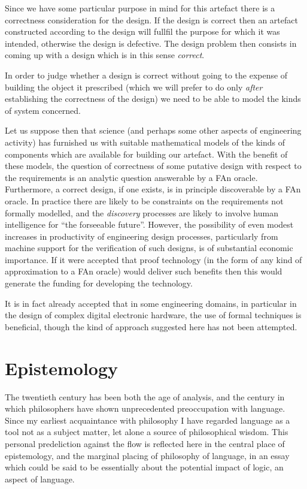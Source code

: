 Since we have some particular purpose in mind for this artefact there is a correctness consideration for the design.
If the design is correct then an artefact constructed according to the design will fullfil the purpose for which it was intended, otherwise the design is defective.
The design problem then consists in coming up with a design which is in this sense {\it correct}.

In order to judge whether a design is correct without going to the expense of building the object it prescribed (which we will prefer to do only {\it after} establishing the correctness of the design) we need to be able to model the kinds of system concerned.

Let us suppose then that science (and perhaps some other aspects of engineering activity) has furnished us with suitable mathematical models of the kinds of components which are available for building our artefact.
With the benefit of these models, the question of correctness of some putative design with respect to the requirements is an analytic question answerable by a FAn oracle.
Furthermore, a correct design, if one exists, is in principle discoverable by a FAn oracle.
In practice there are likely to be constraints on the requirements not formally modelled, and the {\it discovery} processes are likely to involve human intelligence for ``the forseeable future''.
However, the possibility of even modest increases in productivity of engineering design processes, particularly from machine support for the verification of such designs, is of substantial economic importance.
If it were accepted that proof technology (in the form of any kind of approximation to a FAn oracle) would deliver such benefits then this would generate the funding for developing the technology.

It is in fact already accepted that in some engineering domains, in particular in the design of complex digital electronic hardware, the use of formal techniques is beneficial, though the kind of approach suggested here has not been attempted.

\section{Epistemology}

The twentieth century has been both the age of analysis, and the century in which philosophers have shown unprecedented preoccupation with language.
Since my earliest acquaintance with philosophy I have regarded language as a tool not as a subject matter, let alone a source of philosophical wisdom.
This personal predeliction against the flow is reflected here in the central place of epistemology, and the marginal placing of philosophy of language, in an essay which could be said to be essentially about the potential impact of logic, an aspect of language.

